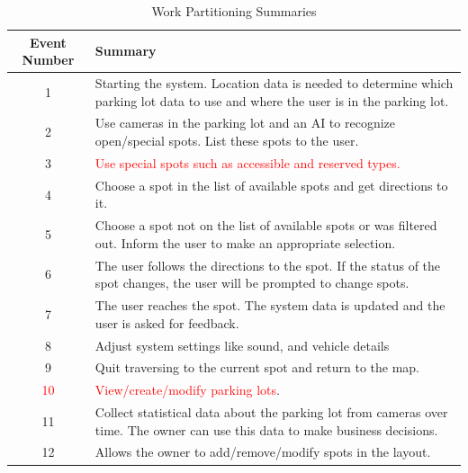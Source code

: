 \documentclass[12pt,letterpaper]{article}
\begin{document}
\begin{table}[h]
\caption{Work Partitioning Summaries}
    \centering
    \begin{tabular}{|c|p{10cm}|}
    \hline
    \textbf{Event Number} & \textbf{Summary} \\
    \hline
    1 & Starting the system. Location data is needed to determine which parking
    lot data to use and where the user is in the parking lot.\\
    \hline
    2 & Use cameras in the parking lot and an AI to recognize open/special
    spots. List these spots to the user.\\
    \hline
    3 & \textcolor{red}{Use special spots such as accessible and reserved
    types.}\\ %
    \hline
    4 & Choose a spot in the list of available spots and get directions to it.\\
    \hline
    5 & Choose a spot not on the list of available spots or was filtered out.
    Inform the user to make an appropriate selection.\\
    \hline
    6 & The user follows the directions to the spot. If the status of the spot
    changes, the user will be prompted to change spots.\\
    \hline
    7 & The user reaches the spot. The system data is updated and the user is
    asked for feedback.\\
    \hline
    8 & Adjust system settings like sound, and vehicle details\\
    \hline
    9 & Quit traversing to the current spot and return to the map.\\
    \hline
    \textcolor{red}{10} & \textcolor{red}{View/create/modify parking lots}.\\
    \hline
    11 & Collect statistical data about the parking lot from cameras over time.
    The owner can use this data to make business decisions.\\
    \hline
    12 & Allows the owner to add/remove/modify spots in the layout.\\
    \hline
    \end{tabular}
\end{table}

\newpage
\end{document}
